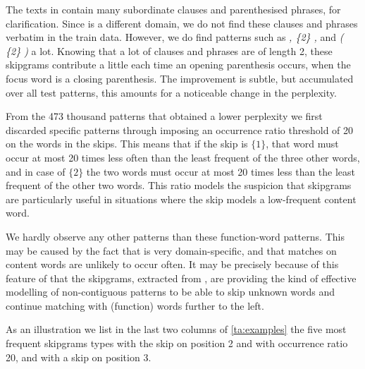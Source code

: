 The texts in \emea contain many subordinate clauses and parenthesised phrases, for clarification. Since \obw is a different domain, we do not find these clauses and phrases verbatim in the train data. However, we do find patterns such as \emph{, \{2\} ,} and \emph{( \{2\} )} a lot. Knowing that a lot of clauses and phrases are of length 2, these skipgrams contribute a little each time an opening parenthesis occurs, when the focus word is a closing parenthesis. The improvement is subtle, but accumulated over all test patterns, this amounts for a noticeable change in the perplexity.

From the 473 thousand patterns that obtained a lower perplexity we first discarded specific patterns through imposing an occurrence ratio threshold of 20 on the words in the skips. This means that if the skip is $\{1\}$, that word must occur at most 20 times less often than the least frequent of the three other words, and in case of $\{2\}$ the two words must occur at most 20 times less than the least frequent of the other two words. This ratio models the suspicion that skipgrams are particularly useful in situations where the skip models a low-frequent content word. 

We hardly observe any other patterns than these function-word patterns. 
This may be caused by the fact that \emea is very domain-specific, and that matches on content words are unlikely to occur often. It may be precisely because of this feature of \emea that the skipgrams, extracted from \obw, are providing the kind of effective modelling of non-contiguous patterns to be able to skip unknown words and continue matching with (function) words further to the left.

As an illustration we list in the last two columns of \cref{ta:examples} the five most frequent skipgrams types with the skip on position 2 and with occurrence ratio 20, and with a skip on position 3.


